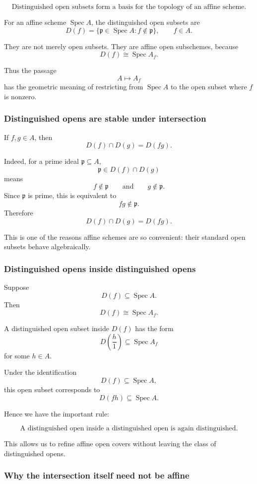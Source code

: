 \documentclass[12pt,a4paper]{article}
\DeclareMathOperator{\Spec}{Spec}
\providecommand{\Spec}{\operatorname{Spec}}
\theoremstyle{notespace}
\begin{document}
\[
\boxed{
	\text{Distinguished open subsets form a basis for the topology of an affine scheme.}
}
\]

For an affine scheme \(\Spec A\), the distinguished open subsets are
\[
D(f)=\{\mathfrak p\in \Spec A : f\notin \mathfrak p\},
\qquad f\in A.
\]

They are not merely open subsets. They are affine open subschemes, because
\[
D(f)\cong \Spec A_f.
\]

Thus the passage
\[
A \longmapsto A_f
\]
has the geometric meaning of restricting from \(\Spec A\) to the open subset where \(f\) is nonzero.

\subsubsection*{Distinguished opens are stable under intersection}

If \(f,g\in A\), then
\[
D(f)\cap D(g)=D(fg).
\]

Indeed, for a prime ideal \(\mathfrak p\subseteq A\),
\[
\mathfrak p\in D(f)\cap D(g)
\]
means
\[
f\notin \mathfrak p
\qquad\text{and}\qquad
g\notin \mathfrak p.
\]
Since \(\mathfrak p\) is prime, this is equivalent to
\[
fg\notin \mathfrak p.
\]
Therefore
\[
D(f)\cap D(g)=D(fg).
\]

This is one of the reasons affine schemes are so convenient: their standard open subsets behave algebraically.

\subsubsection*{Distinguished opens inside distinguished opens}

Suppose
\[
D(f)\subseteq \Spec A.
\]
Then
\[
D(f)\cong \Spec A_f.
\]

A distinguished open subset inside \(D(f)\) has the form
\[
D\left(\frac{h}{1}\right)\subseteq \Spec A_f
\]
for some \(h\in A\).

Under the identification
\[
D(f)\subseteq \Spec A,
\]
this open subset corresponds to
\[
D(fh)\subseteq \Spec A.
\]

Hence we have the important rule:

\[
\boxed{
	\text{A distinguished open inside a distinguished open is again distinguished.}
}
\]

This allows us to refine affine open covers without leaving the class of distinguished opens.

\subsubsection*{Why the intersection itself need not be affine}
\end{document}
